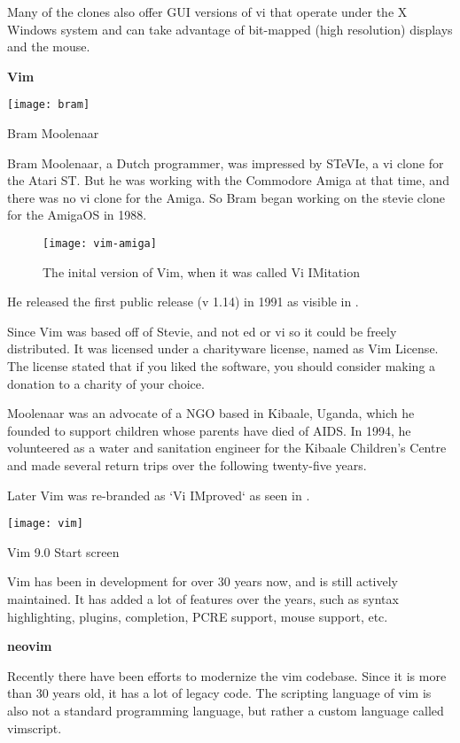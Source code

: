 Many of the clones also offer GUI versions of vi that operate under the X Windows system and can take advantage of bit-mapped (high resolution) displays and the mouse.

\textbf{Vim}

\begin{marginfigure}
  \texttt{[image: bram]}
  \caption{Bram Moolenaar}
\end{marginfigure}

Bram Moolenaar, a Dutch programmer, was impressed by
STeVIe, a vi clone for the Atari ST.
But he was working with the Commodore Amiga at that time,
and there was no vi clone for the Amiga.
So Bram began working on the stevie clone
for the AmigaOS in 1988.

\begin{figure}[h!]
  \texttt{[image: vim-amiga]}
  \caption{The inital version of Vim, when it was called Vi IMitation}
\end{figure}

He released the first public release (v 1.14) in 1991
as visible in .

Since Vim was based off of Stevie, and not ed or vi
so it could be freely distributed.
It was licensed under a charityware license,
named as Vim License.
The license stated that if you liked the software,
you should consider making a donation to a charity
of your choice.

Moolenaar was an advocate of a NGO based in Kibaale, Uganda,
which he founded to support children whose parents have died of AIDS.
In 1994, he volunteered as a water and sanitation engineer for the
Kibaale Children's Centre and made several return trips
over the following twenty-five years.

Later Vim was re-branded as `Vi IMproved`
as seen in .

\begin{marginfigure}
  \texttt{[image: vim]}
  \caption{Vim 9.0 Start screen}
\end{marginfigure}

Vim has been in development for over 30 years now,
and is still actively maintained.
It has added a lot of features over the years,
such as syntax highlighting, plugins,
completion, PCRE support, mouse support, etc.

\textbf{neovim}

Recently there have been efforts
to modernize the vim codebase.
Since it is more than 30 years old,
it has a lot of legacy code.
The scripting language of vim is
also not a standard programming language,
but rather a custom language called vimscript.

